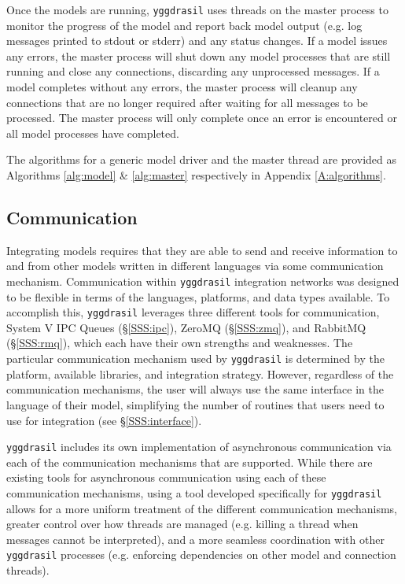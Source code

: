 \documentclass[journal]{IEEEtran}
\newcommand{\pkg}{{\tt yggdrasil}{}}
\newcommand{\A}{Appendix{ }}
\begin{document}
Once the models are running, {\pkg} uses threads on the master process to monitor the progress of the model and report back model output (e.g. log messages printed to stdout or stderr) and any status changes. If a model issues any errors, the master process will shut down any model processes that are still running and close any connections, discarding any unprocessed messages. If a model completes without any errors, the master process will cleanup any connections that are no longer required after waiting for all messages to be processed. The master process will only complete once an error is encountered or all model processes have completed.

The algorithms for a generic model driver and the master thread are provided as Algorithms \ref{alg:model} \& \ref{alg:master} respectively in \A\ref{A:algorithms}.

\subsection{Communication}\label{SS:communication}
%
Integrating models requires that they are able to send and receive information to and from other models written in different languages via some communication mechanism. Communication within {\pkg} integration networks was designed to be flexible in terms of the languages, platforms, and data types available. To accomplish this, {\pkg} leverages three different tools for communication, System V IPC Queues (\S\ref{SSS:ipc}), ZeroMQ (\S\ref{SSS:zmq}), and RabbitMQ (\S\ref{SSS:rmq}), which each have their own strengths and weaknesses. The particular communication mechanism used by {\pkg} is determined by the platform, available libraries, and integration strategy. However, regardless of the communication mechanisms, the user will always use the same interface in the language of their model, simplifying the number of routines that users need to use for integration (see \S\ref{SSS:interface}).

{\pkg} includes its own implementation of asynchronous communication via each of the communication mechanisms that are supported. While there are existing tools for asynchronous communication using each of these communication mechanisms, using a tool developed specifically for {\pkg} allows for a more uniform treatment of the different communication mechanisms, greater control over how threads are managed (e.g. killing a thread when messages cannot be interpreted), and a more seamless coordination with other {\pkg} processes (e.g. enforcing dependencies on other model and connection threads).
\end{document}
